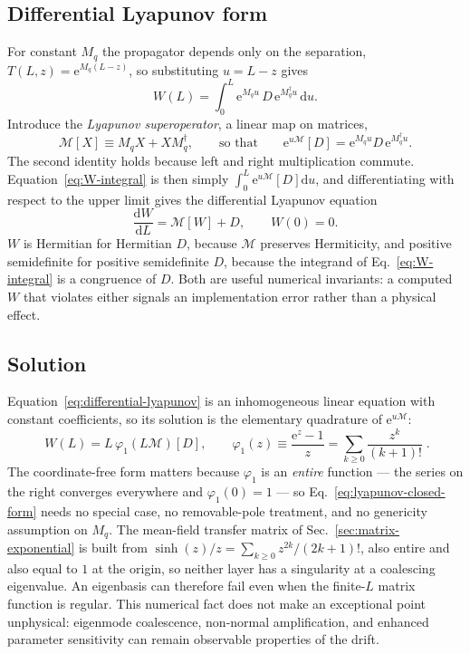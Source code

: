 \documentclass[11pt,a4paper]{article}
\newcommand{\dd}{\mathrm d}
\newcommand{\e}{\mathrm e}
\begin{document}
\subsection{Differential Lyapunov form}

For constant $M_q$ the propagator depends only on the separation,
$T(L,z)=\e^{M_q(L-z)}$, so substituting $u=L-z$ gives
\begin{equation}
W(L)=\int_0^L \e^{M_qu}\,D\,\e^{M_q^\dagger u}\,\dd u .
\label{eq:W-integral}
\end{equation}
Introduce the \emph{Lyapunov superoperator}, a linear map on matrices,
\begin{equation}
\mathcal M[X]\equiv M_qX+XM_q^\dagger,
\qquad\text{so that}\qquad
\e^{u\mathcal M}[D]=\e^{M_qu}D\,\e^{M_q^\dagger u}.
\label{eq:lyapunov-superoperator}
\end{equation}
The second identity holds because left and right multiplication commute.
Equation~\eqref{eq:W-integral} is then simply $\int_0^L\e^{u\mathcal M}[D]\dd u$,
and differentiating with respect to the upper limit gives the differential
Lyapunov equation
\begin{equation}
\boxed{\;
\frac{\dd W}{\dd L}=\mathcal M[W]+D,\qquad W(0)=0 .\;}
\label{eq:differential-lyapunov}
\end{equation}
$W$ is Hermitian for Hermitian $D$, because $\mathcal M$ preserves
Hermiticity, and positive semidefinite for positive semidefinite $D$, because
the integrand of Eq.~\eqref{eq:W-integral} is a congruence of $D$. Both are
useful numerical invariants: a computed $W$ that violates either signals an implementation
error rather than a physical effect.

\subsection{Solution}
\label{sec:lyapunov-solution}

Equation~\eqref{eq:differential-lyapunov} is an inhomogeneous linear equation
with constant coefficients, so its solution is the elementary quadrature of
$\e^{u\mathcal M}$:
\begin{equation}
\boxed{\;
W(L)=L\,\varphi_1\!\left(L\mathcal M\right)[D],
\qquad
\varphi_1(z)\equiv\frac{\e^{z}-1}{z}
=\sum_{k\ge0}\frac{z^k}{(k+1)!}\; .}
\label{eq:lyapunov-closed-form}
\end{equation}
The coordinate-free form matters because $\varphi_1$ is an \emph{entire}
function --- the series on the right converges everywhere and
$\varphi_1(0)=1$ --- so Eq.~\eqref{eq:lyapunov-closed-form} needs no special
case, no removable-pole treatment, and no genericity assumption on $M_q$. The
mean-field transfer matrix of Sec.~\ref{sec:matrix-exponential} is built from
$\sinh(z)/z=\sum_{k\ge0}z^{2k}/(2k+1)!$, also entire and also equal to $1$ at
the origin, so neither layer has a singularity at a coalescing eigenvalue.
An eigenbasis can therefore fail even when the finite-$L$ matrix function is
regular. This numerical fact does not make an exceptional point unphysical:
eigenmode coalescence, non-normal amplification, and enhanced parameter
sensitivity can remain observable properties of the drift.
\end{document}
